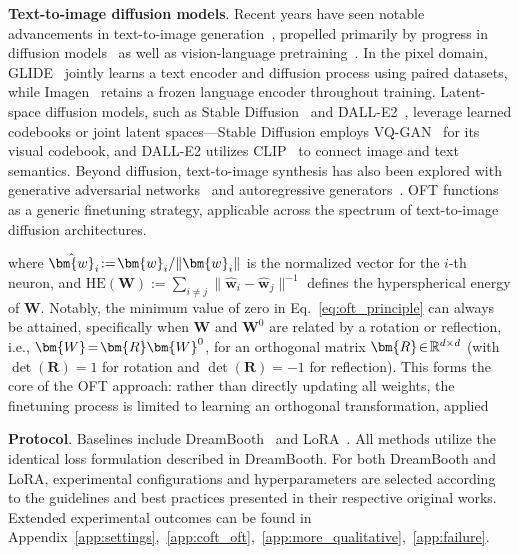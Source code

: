 \begin{itemize}[leftmargin=*,nosep]
\begin{itemize}[leftmargin=*,nosep]
\textbf{Text-to-image diffusion models}. Recent years have seen notable advancements in text-to-image generation~\cite{saharia2022photorealistic,ramesh2022hierarchical,rombach2022high,gu2022vector,nichol2022glide}, propelled primarily by progress in diffusion models~\cite{ho2020denoising,song2021score,song2021denoising,dhariwal2021diffusion} as well as vision-language pretraining~\cite{su2020vlbert,lu2019vilbert,radford2021learning,wang2021simvlm,li2022blip,li2023blip,alayrac2022flamingo,schuhmann2022laion}. In the pixel domain, GLIDE~\cite{nichol2022glide} jointly learns a text encoder and diffusion process using paired datasets, while Imagen~\cite{saharia2022photorealistic} retains a frozen language encoder throughout training. Latent-space diffusion models, such as Stable Diffusion~\cite{rombach2022high} and DALL-E2~\cite{ramesh2022hierarchical}, leverage learned codebooks or joint latent spaces—Stable Diffusion employs VQ-GAN~\cite{esser2021taming} for its visual codebook, and DALL-E2 utilizes CLIP~\cite{radford2021learning} to connect image and text semantics. Beyond diffusion, text-to-image synthesis has also been explored with generative adversarial networks~\cite{reed2016generative,zhang2017stackgan,xu2018attngan,li2019controllable} and autoregressive generators~\cite{ramesh2021zero,ding2021cogview,wu2022nuwa,yuscaling}. OFT functions as a generic finetuning strategy, applicable across the spectrum of text-to-image diffusion architectures.

where $\thickmuskip=2mu \medmuskip=2mu \hat{\bm{w}}_i:=\bm{w}_i/\|\bm{w}_i\|$ is the normalized vector for the $i$-th neuron, and $\text{HE}(\bm{W}):= \sum_{i\neq j} \|\hat{\bm{w}}_i-\hat{\bm{w}}_j\|^{-1}$ defines the hyperspherical energy of $\bm{W}$. Notably, the minimum value of zero in Eq.~\eqref{eq:oft_principle} can always be attained, specifically when $\bm{W}$ and $\bm{W}^0$ are related by a rotation or reflection, i.e., $\thickmuskip=2mu \medmuskip=2mu \bm{W}=\bm{R}\bm{W}^0$, for an orthogonal matrix $\thickmuskip=2mu \medmuskip=2mu \bm{R}\in\mathbb{R}^{d\times d}$ (with $\det(\bm{R}) = 1$ for rotation and $\det(\bm{R}) = -1$ for reflection). This forms the core of the OFT approach: rather than directly updating all weights, the finetuning process is limited to learning an orthogonal transformation, applied

\textbf{Protocol}. Baselines include DreamBooth~\cite{ruiz2023dreambooth} and LoRA~\cite{hulora2022}. All methods utilize the identical loss formulation described in DreamBooth. For both DreamBooth and LoRA, experimental configurations and hyperparameters are selected according to the guidelines and best practices presented in their respective original works. Extended experimental outcomes can be found in Appendix~\ref{app:settings},~\ref{app:coft_oft},~\ref{app:more_qualitative},~\ref{app:failure}.


\end{itemize}
\end{itemize}
